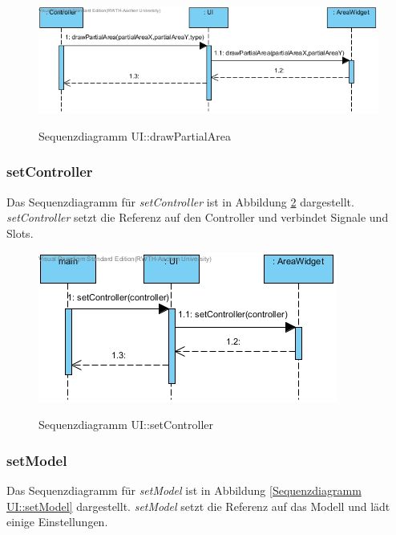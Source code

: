 \begin{figure}[H]
	\centering
	\includegraphics[scale=.75]{Bilder/UI__drawPartialArea().jpg}\\
	\caption{Sequenzdiagramm UI::drawPartialArea}
	\label{Sequenzdiagramm UI::drawPartialArea}
\end{figure}
\newpage
\subsubsection*{setController}

Das Sequenzdiagramm für \emph{setController} ist in Abbildung \ref{Sequenzdiagramm UI::setController} dargestellt. \emph{setController} setzt die Referenz auf den Controller und verbindet Signale und Slots.

\begin{figure}[H]
	\centering
	\includegraphics[scale=.85]{Bilder/UI__setController().jpg}\\
	\caption{Sequenzdiagramm UI::setController}
	\label{Sequenzdiagramm UI::setController}
\end{figure}

\subsubsection*{setModel}

Das Sequenzdiagramm für \emph{setModel} ist in Abbildung \ref{Sequenzdiagramm UI::setModel} dargestellt. \emph{setModel} setzt die Referenz auf das Modell und lädt einige Einstellungen.

